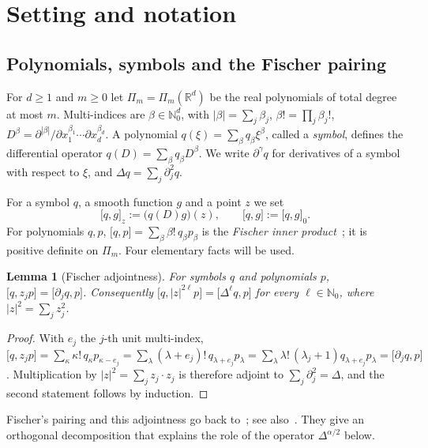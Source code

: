 \documentclass[12pt]{amsart}
\newtheorem{lemma}[theorem]{Lemma}
\theoremstyle{definition}
\theoremstyle{remark}
\newcommand{\R}{\mathbb{R}}
\newcommand{\N}{\mathbb{N}}
\newcommand{\Pm}{\Pi_m}
\newcommand{\fp}[2]{\bigl[#1,#2\bigr]}          %
\newcommand{\fpz}[3]{\bigl[#1,#2\bigr]_{#3}}     %
\begin{document}
\section{Setting and notation}\label{sec:setting}

\subsection{Polynomials, symbols and the Fischer pairing}
For $d\ge1$ and $m\ge0$ let $\Pm=\Pi_m(\R^d)$ be the real polynomials of total degree at most
$m$. Multi-indices are $\beta\in\N_0^d$, with $|\beta|=\sum_j\beta_j$, $\beta!=\prod_j\beta_j!$,
$D^\beta=\partial^{|\beta|}/\partial x_1^{\beta_1}\cdots\partial x_d^{\beta_d}$. A polynomial
$q(\xi)=\sum_\beta q_\beta\xi^\beta$, called a \emph{symbol}, defines the differential operator
$q(D)=\sum_\beta q_\beta D^\beta$. We write $\partial^\gamma q$ for derivatives of a symbol with
respect to $\xi$, and $\Delta q=\sum_j\partial_j^2q$.

For a symbol $q$, a smooth function $g$ and a point $z$ we set
\begin{equation}\label{eq:pairing}
  \fpz{q}{g}{z} := \bigl(q(D)g\bigr)(z), \qquad \fp{q}{g}:=\fpz{q}{g}{0}.
\end{equation}
For polynomials $q,p$, $\fp{q}{p}=\sum_\beta\beta!\,q_\beta p_\beta$ is the \emph{Fischer inner
product}~\cite{Fischer1918,Shapiro1989}; it is positive definite on $\Pm$. Four elementary facts will be used.

\begin{lemma}[Fischer adjointness]\label{lem:fischer}
For symbols $q$ and polynomials $p$, $\fp{q}{z_jp}=\fp{\partial_jq}{p}$. Consequently
$\fp{q}{|z|^{2\ell}p}=\fp{\Delta^\ell q}{p}$ for every $\ell\in\N_0$, where
$|z|^2=\sum_jz_j^2$.
\end{lemma}

\begin{proof}
With $e_j$ the $j$-th unit multi-index,
$\fp{q}{z_jp}=\sum_\kappa\kappa!\,q_\kappa p_{\kappa-e_j}
=\sum_\lambda(\lambda+e_j)!\,q_{\lambda+e_j}p_\lambda
=\sum_\lambda\lambda!\,(\lambda_j+1)q_{\lambda+e_j}p_\lambda=\fp{\partial_jq}{p}$.
Multiplication by $|z|^2=\sum_jz_j\cdot z_j$ is therefore adjoint to $\sum_j\partial_j^2=\Delta$,
and the second statement follows by induction.
\end{proof}

Fischer's pairing and this adjointness go back to~\cite{Fischer1918}; see
also~\cite{Shapiro1989}. They give an orthogonal decomposition that explains the role of the
operator $\Delta^{\alpha/2}$ below.
\end{document}
